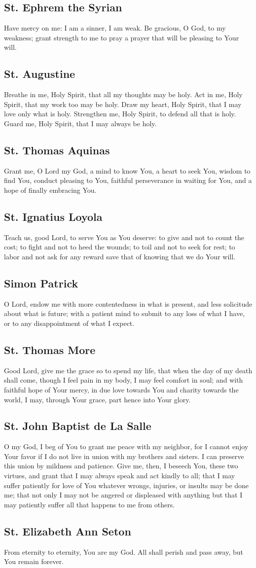 \documentclass[12pt]{article}
\newcommand{\prayertitle}[1]{\subsection{#1}}
\begin{document}
\prayertitle{St. Ephrem the Syrian}
Have mercy on me:
I am a sinner, I am weak.
Be gracious, O God, to my weakness;
grant strength to me to pray a prayer that will be pleasing to Your will.

\prayertitle{St. Augustine}
Breathe in me, Holy Spirit, that all my thoughts may be holy.
Act in me, Holy Spirit, that my work too may be holy.
Draw my heart, Holy Spirit, that I may love only what is holy.
Strengthen me, Holy Spirit, to defend all that is holy.
Guard me, Holy Spirit, that I may always be holy.

\prayertitle{St. Thomas Aquinas}
Grant me, O Lord my God,
a mind to know You,
a heart to seek You,
wisdom to find You,
conduct pleasing to You,
faithful perseverance in waiting for You,
and a hope of finally embracing You.

\prayertitle{St. Ignatius Loyola}
Teach us, good Lord, to serve You as You deserve:
to give and not to count the cost;
to fight and not to heed the wounds;
to toil and not to seek for rest;
to labor and not ask for any reward save that of knowing that we do Your will.

\prayertitle{Simon Patrick}
O Lord, endow me with more contentedness in what is present, and less solicitude about what is future;
with a patient mind to submit to any loss of what I have, or to  any disappointment of what I expect.

\prayertitle{St. Thomas More}
Good Lord, give me the grace so to spend my life, that when the day of my death shall come, though I feel pain in my body, I may feel comfort in soul;
and with faithful hope of Your mercy, in due love towards You and charity towards the world, I may, through Your grace, part hence into Your glory.

\prayertitle{St. John Baptist de La Salle}
O my God, I beg of You to grant me peace with my neighbor, for I cannot enjoy Your favor if I do not live in union with my brothers and sisters.
I can preserve this union by mildness and patience.
Give me, then, I beseech You, these two virtues, and grant that I may always speak and act kindly to all;
that I may suffer patiently for love of You whatever wrongs, injuries, or insults may be done me;
that not only I may not be angered or displeased with anything but that I may patiently suffer all that happens to me from others.

\prayertitle{St. Elizabeth Ann Seton}
From eternity to eternity, You are my God.
All shall perish and pass away, but You remain forever.
\end{document}
